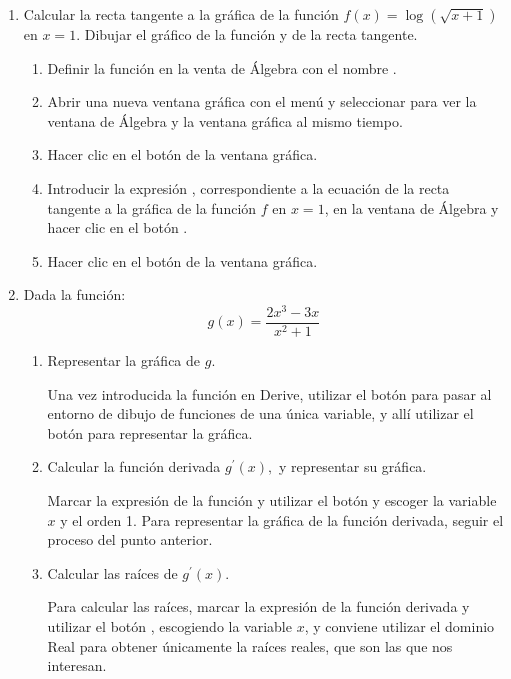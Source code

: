 \begin{enumerate}[leftmargin=*]
\item Calcular la recta tangente a la gráfica de la función $f(x)=\log(\sqrt{x+1})$ en $x=1$.
Dibujar el gráfico de la función y de la recta tangente.
\begin{indicacion}
\begin{enumerate}
\item Definir la función en la venta de Álgebra con el nombre .
\item Abrir una nueva ventana gráfica con el menú  y seleccionar  para ver la ventana de Álgebra y la ventana gráfica al mismo tiempo.
\item Hacer clic en el botón  de la ventana gráfica.
\item Introducir la expresión , correspondiente a la ecuación de la recta tangente a la gráfica de la función $f$ en $x=1$, en la ventana de Álgebra y hacer clic en el botón .
\item Hacer clic en el botón  de la ventana gráfica.
\end{enumerate}
\end{indicacion}



\item Dada la función:
\[
g(x)=\dfrac{2x^{3}-3x}{x^{2}+1}
\]

\begin{enumerate}
\item  Representar la gráfica de $g$.
\begin{indicacion}
Una vez introducida la función en Derive, utilizar el botón  para pasar al entorno de dibujo de funciones de una única
variable, y allí utilizar el botón  para representar la gráfica. 
\end{indicacion}

\item  Calcular la función derivada $g^{\prime }(x),$ y representar su
gráfica.
\begin{indicacion}
Marcar la expresión de la función y utilizar el botón  y escoger la variable $x$ y el orden 1. Para representar
la gráfica de la función derivada, seguir el proceso del punto anterior.
\end{indicacion}

\item  Calcular las raíces de $g^{\prime }(x).$
\begin{indicacion}
Para calcular las raíces, marcar la expresión de la función derivada y utilizar el botón , escogiendo la variable
$x$, y conviene utilizar el dominio Real para obtener únicamente la raíces reales, que son las que nos interesan.
\end{indicacion}


\end{enumerate}
\end{enumerate}
